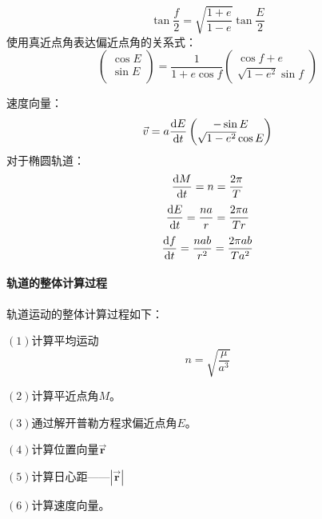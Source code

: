 \begin{equation}
	\tan \frac{f}{2}=\sqrt{\frac{1+e}{1-e}}\tan \frac{E}{2}
\end{equation}
使用真近点角表达偏近点角的关系式：
\begin{equation}
	\begin{pmatrix}
		\cos E\\
		\sin E\\
	\end{pmatrix}
=\frac{1}{1+e\cos f}\begin{pmatrix}
	\cos f+e\\
	\sqrt{1-e^2}\sin f
\end{pmatrix}
\end{equation}

速度向量：
\begin{equation}
	\vec{v}=a\frac{{\rm d} E}{{\rm d} t}\begin{pmatrix}
		-\sin E\\
		\sqrt{1-e^2}\cos E\\
	\end{pmatrix}
\end{equation}
对于椭圆轨道：
\begin{equation}
	\frac{{\rm d} M}{{\rm d} t}=n=\frac{2\pi}{T}
\end{equation}
\begin{equation}
	\frac{{\rm d} E}{{\rm d} t}=\frac{na}{r}=\frac{2\pi a}{Tr}
\end{equation}
\begin{equation}
	\frac{{\rm d} f}{{\rm d} t}=\frac{nab}{r^2}=\frac{2\pi ab}{Ta^2}
\end{equation}
\paragraph{轨道的整体计算过程}
轨道运动的整体计算过程如下：

\noindent $\left(1\right)$计算平均运动\begin{equation}
	n=\sqrt{\frac{\mu}{a^3}}
\end{equation}

\noindent $\left(2\right)$计算平近点角$M$。

\noindent $\left(3\right)$通过解开普勒方程求偏近点角$E$。

\noindent $\left(4\right)$计算位置向量$\vec{\mathbf{r}}$

\noindent $\left(5\right)$计算日心距——$|\vec{\mathbf{r}}|$

\noindent $\left(6\right)$计算速度向量。

